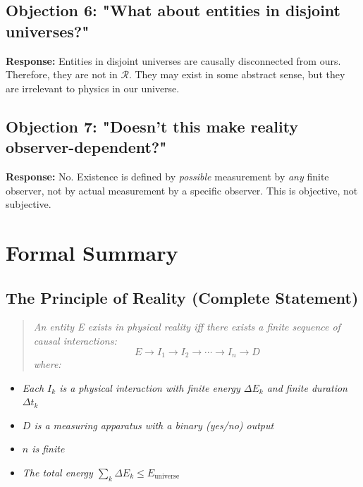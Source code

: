 \documentclass[aps,preprint,showpacs,showkeys]{revtex4}
\begin{document}
\subsection{Objection 6: "What about entities in disjoint universes?"}

\textbf{Response:} Entities in disjoint universes are causally disconnected
from ours. Therefore, they are not in $\mathcal{R}$. They may exist in some
abstract sense, but they are irrelevant to physics in our universe.

\subsection{Objection 7: "Doesn't this make reality observer-dependent?"}

\textbf{Response:} No. Existence is defined by \emph{possible} measurement
by \emph{any} finite observer, not by actual measurement by a specific
observer. This is objective, not subjective.

\section{Formal Summary}

\subsection{The Principle of Reality (Complete Statement)}

\begin{quote}
\emph{An entity E exists in physical reality iff there exists a finite
sequence of causal interactions:} 
\begin{equation}
E \rightarrow I_1 \rightarrow I_2 \rightarrow \cdots \rightarrow I_n
\rightarrow D
\end{equation}
\emph{where:}
\end{quote}

\begin{itemize}
\item \emph{Each $I_k$ is a physical interaction with finite energy $\Delta
E_k$ and finite duration $\Delta t_k$}

\item \emph{$D$ is a measuring apparatus with a binary (yes/no) output}

\item \emph{$n$ is finite}

\item \emph{The total energy $\sum_k \Delta E_k \le E_{\text{universe}}$}
\end{itemize}
\end{document}
